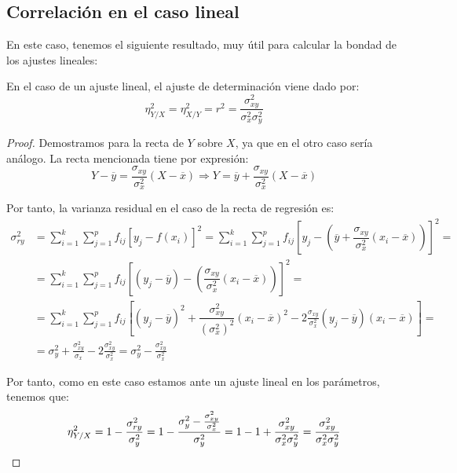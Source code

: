 \subsection{Correlación en el caso lineal}

En este caso, tenemos el siguiente resultado, muy útil para calcular la bondad de los ajustes lineales:
\begin{teo} En el caso de un ajuste lineal, el ajuste de determinación viene dado por:
    \begin{equation*}
        \eta_{Y/X}^2 = \eta_{X/Y}^2 = r^2 = \dfrac{\sigma_{xy}^2}{\sigma_x^2 \sigma_y^2}
    \end{equation*}
\end{teo}
\begin{proof}
    Demostramos para la recta de $Y$ sobre $X$, ya que en el otro caso sería análogo. La recta mencionada tiene por expresión:
    \begin{equation*}
        Y-\overline{y} = \dfrac{\sigma_{xy}}{\sigma_x^2}(X - \overline{x}) 
        \Longrightarrow
        Y = \overline{y} + \dfrac{\sigma_{xy}}{\sigma_x^2}(X - \overline{x})
    \end{equation*}

    Por tanto, la varianza residual en el caso de la recta de regresión es:
    \begin{equation*}\begin{split}
        \sigma_{ry}^2 &
        = \sum_{i=1}^k\sum_{j=1}^p f_{ij}[y_j - f(x_i)]^2
        = \sum_{i=1}^k\sum_{j=1}^p f_{ij}\left[y_j - \left(\overline{y} + \dfrac{\sigma_{xy}}{\sigma_x^2}(x_i - \overline{x})\right)\right]^2 = \\
        & = \sum_{i=1}^k\sum_{j=1}^p f_{ij}\left[(y_j - \overline{y}) - \left(\dfrac{\sigma_{xy}}{\sigma_x^2}(x_i - \overline{x})\right)\right]^2 = \\
        & = \sum_{i=1}^k\sum_{j=1}^p f_{ij}\left[(y_j - \overline{y})^2 + \dfrac{\sigma_{xy}^2}{(\sigma_x^2)^2}(x_i - \overline{x})^2 - 2\frac{\sigma_{xy}}{\sigma_x^2}(y_j-\overline{y})(x_i-\overline{x})\right] = \\
        &= \sigma_y^2 + \frac{\sigma_{xy}^2}{\sigma_x} - 2\frac{\sigma_{xy}^2}{\sigma_x^2}
        = \sigma_y^2 - \frac{\sigma_{xy}^2}{\sigma_x^2}
    \end{split}\end{equation*}

    Por tanto, como en este caso estamos ante un ajuste lineal en los parámetros, tenemos que:
    \begin{equation*}
        \eta_{Y/X}^2 = 1-\frac{\sigma_{ry}^2}{\sigma_y^2}
        = 1-\frac{\sigma_y^2 - \frac{\sigma_{xy}^2}{\sigma_x^2}}{\sigma_y^2}
        = 1-1+\frac{\sigma_{xy}^2}{\sigma_x^2\sigma_y^2} = \frac{\sigma_{xy}^2}{\sigma_x^2\sigma_y^2}
        \qedhere
    \end{equation*}
\end{proof}

